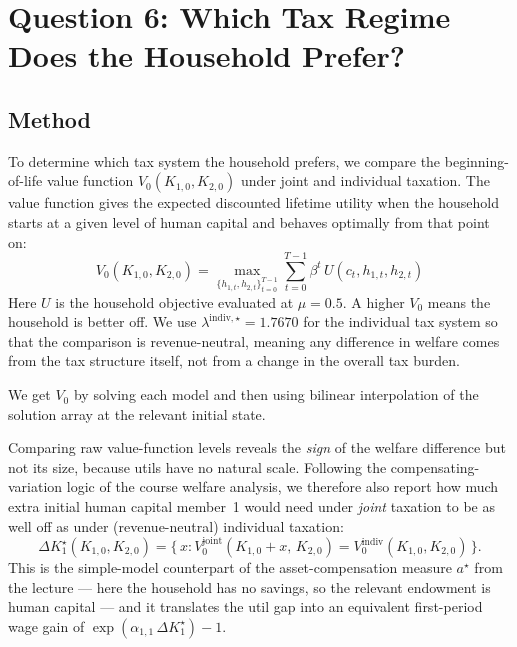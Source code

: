 \section{Question 6: Which Tax Regime Does the Household Prefer?}

\subsection*{Method}

To determine which tax system the household prefers, we compare the beginning-of-life value function $V_0(K_{1,0}, K_{2,0})$ under joint and individual taxation. The value function gives the expected discounted lifetime utility when the household starts at a given level of human capital and behaves optimally from that point on:
%
\begin{equation}
    V_0(K_{1,0}, K_{2,0}) = \max_{\{h_{1,t}, h_{2,t}\}_{t=0}^{T-1}} \sum_{t=0}^{T-1} \beta^t \, U(c_t, h_{1,t}, h_{2,t})
\end{equation}
%
Here $U$ is the household objective evaluated at $\mu = 0.5$. A higher $V_0$ means the household is better off. We use $\lambda^{\text{indiv},\star} = 1.7670$ for the individual tax system so that the comparison is revenue-neutral, meaning any difference in welfare comes from the tax structure itself, not from a change in the overall tax burden.

We get $V_0$ by solving each model and then using bilinear interpolation of the solution array at the relevant initial state.

Comparing raw value-function levels reveals the \emph{sign} of the welfare difference but not its size, because utils have no natural scale. Following the compensating-variation logic of the course welfare analysis, we therefore also report how much extra initial human capital member~1 would need under \emph{joint} taxation to be as well off as under (revenue-neutral) individual taxation:
%
\begin{equation}
    \Delta K_1^{\star}(K_{1,0},K_{2,0}) = \bigl\{\, x : V_0^{\text{joint}}(K_{1,0}+x,\,K_{2,0}) = V_0^{\text{indiv}}(K_{1,0},K_{2,0}) \,\bigr\}.
\end{equation}
%
This is the simple-model counterpart of the asset-compensation measure $a^{\star}$ from the lecture --- here the household has no savings, so the relevant endowment is human capital --- and it translates the util gap into an equivalent first-period wage gain of $\exp(\alpha_{1,1}\,\Delta K_1^{\star})-1$.

